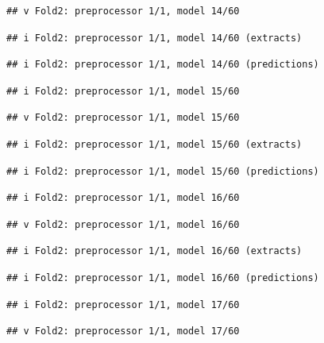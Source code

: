 \documentclass[
]{article}
\begin{document}
\begin{verbatim}
## v Fold2: preprocessor 1/1, model 14/60
\end{verbatim}

\begin{verbatim}
## i Fold2: preprocessor 1/1, model 14/60 (extracts)
\end{verbatim}

\begin{verbatim}
## i Fold2: preprocessor 1/1, model 14/60 (predictions)
\end{verbatim}

\begin{verbatim}
## i Fold2: preprocessor 1/1, model 15/60
\end{verbatim}

\begin{verbatim}
## v Fold2: preprocessor 1/1, model 15/60
\end{verbatim}

\begin{verbatim}
## i Fold2: preprocessor 1/1, model 15/60 (extracts)
\end{verbatim}

\begin{verbatim}
## i Fold2: preprocessor 1/1, model 15/60 (predictions)
\end{verbatim}

\begin{verbatim}
## i Fold2: preprocessor 1/1, model 16/60
\end{verbatim}

\begin{verbatim}
## v Fold2: preprocessor 1/1, model 16/60
\end{verbatim}

\begin{verbatim}
## i Fold2: preprocessor 1/1, model 16/60 (extracts)
\end{verbatim}

\begin{verbatim}
## i Fold2: preprocessor 1/1, model 16/60 (predictions)
\end{verbatim}

\begin{verbatim}
## i Fold2: preprocessor 1/1, model 17/60
\end{verbatim}

\begin{verbatim}
## v Fold2: preprocessor 1/1, model 17/60
\end{verbatim}
\end{document}
